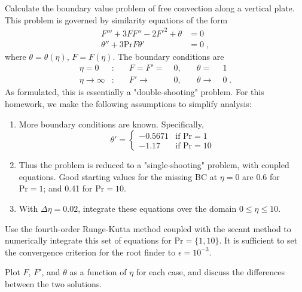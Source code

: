 \documentclass[12pt]{article}
\begin{document}
Calculate the boundary value problem of free convection along a vertical plate. This problem is governed by similarity equations of the form
\begin{equation}
\begin{aligned}
F''' + 3 F F'' - 2F'^2 + \theta &= 0 \\
\theta'' + 3 \text{Pr} F \theta' &= 0
\;,
\end{aligned}
\end{equation}
where $\theta = \theta(\eta)$, $F = F(\eta)$. The boundary conditions are
\begin{equation}
\begin{aligned}
\eta = 0 &: &\quad F = F' =\; &0, &\quad \theta =\; &1 \\
\eta \rightarrow \infty &: &\quad F' \rightarrow\; &0, &\quad \theta \rightarrow\; &0
\;.
\end{aligned}
\end{equation}
As formulated, this is essentially a "double-shooting" problem. For this homework, we make the following assumptions to simplify analysis:
\begin{enumerate}
\item More boundary conditions are known. Specifically,
\begin{equation}
\theta' =
\begin{cases}
-0.5671 &\text{if Pr} = 1 \\
-1.17 &\text{if Pr} = 10
\end{cases}
\end{equation}
\item Thus the problem is reduced to a "single-shooting" problem, with coupled equations. Good starting values for the missing BC at $\eta = 0$ are 0.6 for $\text{Pr} = 1$; and 0.41 for $\text{Pr} = 10$.
\item With $\Delta\eta = 0.02$, integrate these equations over the domain $0 \le \eta \le 10$.
\end{enumerate}

Use the fourth-order Runge-Kutta method coupled with the secant method to numerically integrate this set of equations for $\text{Pr} = \{1,10\}$. It is sufficient to set the convergence criterion for the root finder to $\epsilon = 10^{-3}$.

Plot $F$, $F'$, and $\theta$ as a function of $\eta$ for each case, and discuss the differences between the two solutions.

\end{document}
